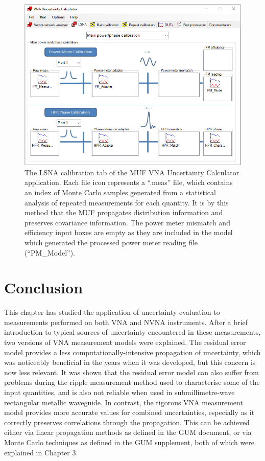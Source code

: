 \documentclass[../thesis/thesis.tex]{subfiles}
\begin{document}
\begin{figure}
	\centering
	\includegraphics[width=\textwidth]{muflsna.png}
	\caption[The LSNA calibration tab of the MUF VNA Uncertainty Calculator application.]{The LSNA calibration tab of the MUF VNA Uncertainty Calculator application. Each file icon represents a ``.meas'' file, which contains an index of Monte Carlo samples generated from a statistical analysis of repeated measurements for each quantity. It is by this method that the MUF propagates distribution information and preserves covariance information. The power meter mismatch and efficiency input boxes are empty as they are included in the model which generated the processed power meter reading file (``PM\_Model'').}
	\label{ch4_fig_muflsna}
\end{figure}

\section{Conclusion}

This chapter has studied the application of uncertainty evaluation to measurements performed on both VNA and NVNA instruments. After a brief introduction to typical sources of uncertainty encountered in these measurements, two versions of VNA measurement models were explained. The residual error model provides a less computationally-intensive propagation of uncertainty, which was noticeably beneficial in the years when it was developed, but this concern is now less relevant. It was shown that the residual error model can also suffer from problems during the ripple measurement method used to characterise some of the input quantities, and is also not reliable when used in submillimetre-wave rectangular metallic waveguide. In contrast, the rigorous VNA measurement model provides more accurate values for combined uncertainties, especially as it correctly preserves correlations through the propagation. This can be achieved either via linear propagation methods as defined in the GUM document, or via Monte Carlo techniques as defined in the GUM supplement, both of which were explained in Chapter 3.
\end{document}
